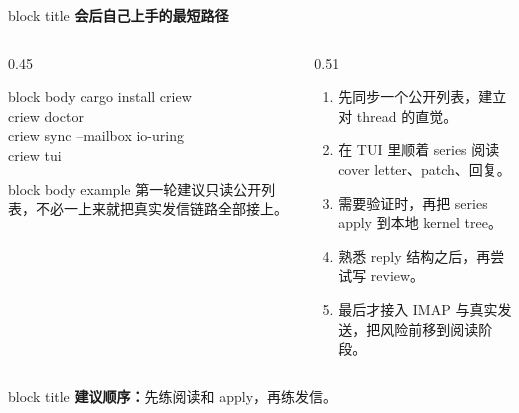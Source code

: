\documentclass[aspectratio=169,professionalfonts]{beamer}
\newcommand{\sectiontitle}[1]{
  \begin{beamercolorbox}[wd=\linewidth,sep=0.7em,rounded=true]{block title}
    \usebeamerfont*{frametitle}\Large\bfseries #1
  \end{beamercolorbox}
  \vspace{0.4em}
}
\begin{document}
\begin{frame}[fragile]
  \sectiontitle{会后自己上手的最短路径}
  \small
  \begin{columns}[T,totalwidth=\textwidth]
    \begin{column}{0.45\textwidth}
      \begin{beamercolorbox}[wd=\linewidth,sep=1em,rounded=true]{block body}
{\ttfamily
cargo install criew\\
criew doctor\\
criew sync --mailbox io-uring\\
criew tui
}
      \end{beamercolorbox}
      \vspace{0.5em}
      \begin{beamercolorbox}[wd=\linewidth,sep=0.7em,rounded=true]{block body example}
        第一轮建议只读公开列表，不必一上来就把真实发信链路全部接上。
      \end{beamercolorbox}
    \end{column}
    \begin{column}{0.51\textwidth}
      \begin{enumerate}
        \item 先同步一个公开列表，建立对 thread 的直觉。
        \item 在 TUI 里顺着 series 阅读 cover letter、patch、回复。
        \item 需要验证时，再把 series apply 到本地 kernel tree。
        \item 熟悉 reply 结构之后，再尝试写 review。
        \item 最后才接入 IMAP 与真实发送，把风险前移到阅读阶段。
      \end{enumerate}
    \end{column}
  \end{columns}
  \vspace{0.5em}
  \begin{beamercolorbox}[wd=\linewidth,sep=0.7em,rounded=true]{block title}
    \textbf{建议顺序：}先练阅读和 apply，再练发信。
  \end{beamercolorbox}
\end{frame}
\end{document}
